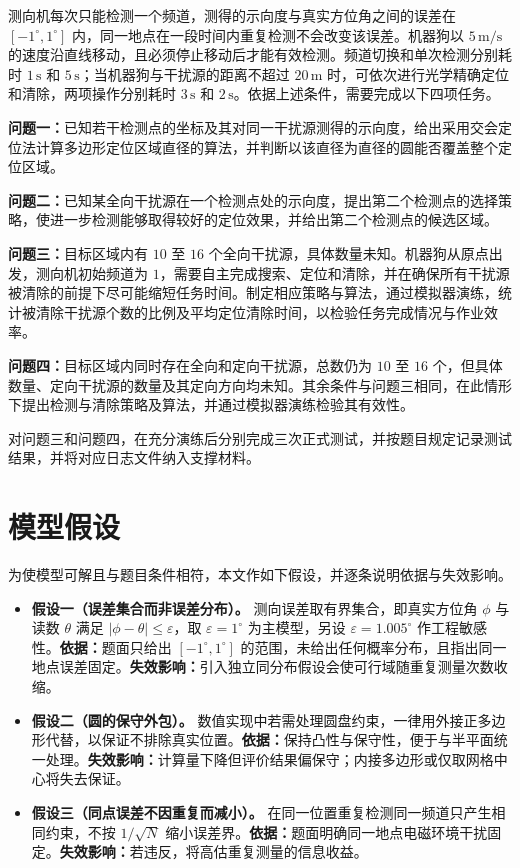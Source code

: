 \documentclass[UTF8,a4paper,zihao=-4,fontset=none]{ctexart}
\begin{document}
测向机每次只能检测一个频道，测得的示向度与真实方位角之间的误差在 \([-1^\circ,1^\circ]\) 内，同一地点在一段时间内重复检测不会改变该误差。机器狗以 \(5\,\mathrm{m/s}\) 的速度沿直线移动，且必须停止移动后才能有效检测。频道切换和单次检测分别耗时 \(1\,\mathrm{s}\) 和 \(5\,\mathrm{s}\)；当机器狗与干扰源的距离不超过 \(20\,\mathrm{m}\) 时，可依次进行光学精确定位和清除，两项操作分别耗时 \(3\,\mathrm{s}\) 和 \(2\,\mathrm{s}\)。依据上述条件，需要完成以下四项任务。

\textbf{问题一：}已知若干检测点的坐标及其对同一干扰源测得的示向度，给出采用交会定位法计算多边形定位区域直径的算法，并判断以该直径为直径的圆能否覆盖整个定位区域。

\textbf{问题二：}已知某全向干扰源在一个检测点处的示向度，提出第二个检测点的选择策略，使进一步检测能够取得较好的定位效果，并给出第二个检测点的候选区域。

\textbf{问题三：}目标区域内有 \(10\) 至 \(16\) 个全向干扰源，具体数量未知。机器狗从原点出发，测向机初始频道为 \(1\)，需要自主完成搜索、定位和清除，并在确保所有干扰源被清除的前提下尽可能缩短任务时间。制定相应策略与算法，通过模拟器演练，统计被清除干扰源个数的比例及平均定位清除时间，以检验任务完成情况与作业效率。

\textbf{问题四：}目标区域内同时存在全向和定向干扰源，总数仍为 \(10\) 至 \(16\) 个，但具体数量、定向干扰源的数量及其定向方向均未知。其余条件与问题三相同，在此情形下提出检测与清除策略及算法，并通过模拟器演练检验其有效性。

对问题三和问题四，在充分演练后分别完成三次正式测试，并按题目规定记录测试结果，并将对应日志文件纳入支撑材料。

\section{模型假设}

为使模型可解且与题目条件相符，本文作如下假设，并逐条说明依据与失效影响。

\begin{itemize}[label=\textbullet,leftmargin=2em]
  \item \textbf{假设一（误差集合而非误差分布）。} 测向误差取有界集合，即真实方位角 $\phi$ 与读数 $\theta$ 满足 $\lvert\phi-\theta\rvert\le\varepsilon$，取 $\varepsilon=1^\circ$ 为主模型，另设 $\varepsilon=1.005^\circ$ 作工程敏感性。\textbf{依据：}题面只给出 $[-1^\circ,1^\circ]$ 的范围，未给出任何概率分布，且指出同一地点误差固定。\textbf{失效影响：}引入独立同分布假设会使可行域随重复测量次数收缩。

  \item \textbf{假设二（圆的保守外包）。} 数值实现中若需处理圆盘约束，一律用外接正多边形代替，以保证不排除真实位置。\textbf{依据：}保持凸性与保守性，便于与半平面统一处理。\textbf{失效影响：}计算量下降但评价结果偏保守；内接多边形或仅取网格中心将失去保证。

  \item \textbf{假设三（同点误差不因重复而减小）。} 在同一位置重复检测同一频道只产生相同约束，不按 $1/\sqrt{N}$ 缩小误差界。\textbf{依据：}题面明确同一地点电磁环境干扰固定。\textbf{失效影响：}若违反，将高估重复测量的信息收益。

\end{itemize}
\end{document}
